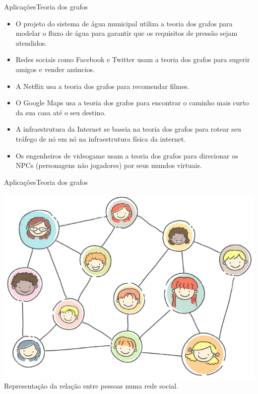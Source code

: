 \documentclass[t]{beamer}
\begin{document}
\begin{ftst}{Aplicações}{Teoria dos grafos}
\justifying
\begin{itemize}
    \item O projeto do sistema de água municipal utiliza a teoria dos grafos para modelar o fluxo de água para garantir que os requisitos de pressão sejam atendidos.
    \item Redes sociais como Facebook e Twitter usam a teoria dos grafos para sugerir amigos e vender anúncios.
    \item A Netflix usa a teoria dos grafos para recomendar filmes.
    \item O Google Maps usa a teoria dos grafos para encontrar o caminho mais curto da sua casa até o seu destino.
    \item A infraestrutura da Internet se baseia na teoria dos grafos para rotear seu tráfego de nó em nó na infraestrutura física da internet.
    \item Os engenheiros de videogame usam a teoria dos grafos para direcionar os NPCs (personagens não jogadores) por seus mundos virtuais.
\end{itemize}

\end{ftst}


\begin{ftst}{Aplicações}{Teoria dos grafos}

\centering
\includegraphics[scale=0.5]{Figuras/socialmedia.png}\\
Representação da relação entre pessoas numa rede social.

\end{ftst}
\end{document}
